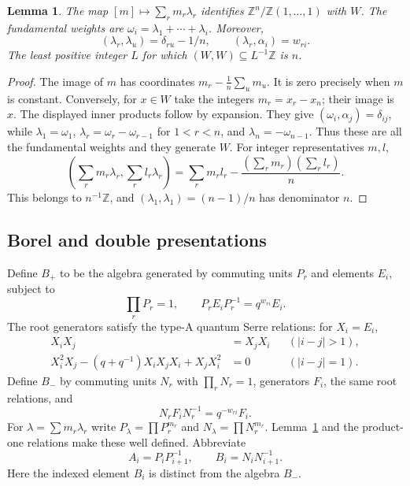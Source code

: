 \documentclass[11pt]{article}
\newtheorem{lemma}[theorem]{Lemma}
\theoremstyle{definition}
\theoremstyle{remark}
\newcommand{\Z}{\mathbb{Z}}
\begin{document}
\begin{lemma}\label{lem:lattice}
The map $[m]\mapsto\sum_r m_r\lambda_r$ identifies $\Z^n/\Z(1,\ldots,1)$ with $W$. The fundamental weights are $\omega_i=\lambda_1+\cdots+\lambda_i$. Moreover,
\[
 (\lambda_r,\lambda_u)=\delta_{ru}-1/n,\qquad
 (\lambda_r,\alpha_i)=w_{ri}.
\]
The least positive integer $L$ for which $(W,W)\subseteq L^{-1}\Z$ is $n$.
\end{lemma}
\begin{proof}
The image of $m$ has coordinates $m_r-\frac1n\sum_u m_u$. It is zero precisely when $m$ is constant. Conversely, for $x\in W$ take the integers $m_r=x_r-x_n$; their image is $x$. The displayed inner products follow by expansion. They give $(\omega_i,\alpha_j)=\delta_{ij}$, while
$\lambda_1=\omega_1$, $\lambda_r=\omega_r-\omega_{r-1}$ for $1<r<n$, and $\lambda_n=-\omega_{n-1}$. Thus these are all the fundamental weights and they generate $W$. For integer representatives $m,l$,
\[
 \left(\sum_r m_r\lambda_r,\sum_r l_r\lambda_r\right)
 =\sum_r m_rl_r-\frac{(\sum_r m_r)(\sum_r l_r)}n.
\]
This belongs to $n^{-1}\Z$, and $(\lambda_1,\lambda_1)=(n-1)/n$ has denominator $n$.
\end{proof}

\subsection{Borel and double presentations}
Define $B_+$ to be the algebra generated by commuting units $P_r$ and elements $E_i$, subject to
\begin{equation}\label{eq:positive}
 \prod_rP_r=1,\qquad P_rE_iP_r^{-1}=q^{w_{ri}}E_i.
\end{equation}
The root generators satisfy the type-A quantum Serre relations: for $X_i=E_i$,
\begin{equation}\label{eq:serre}
 \begin{aligned}
 X_iX_j&=X_jX_i &&(|i-j|>1),\\
 X_i^2X_j-(q+q^{-1})X_iX_jX_i+X_jX_i^2&=0 &&(|i-j|=1).
 \end{aligned}
\end{equation}
Define $B_-$ by commuting units $N_r$ with $\prod_rN_r=1$, generators $F_i$, the same root relations, and
\begin{equation}\label{eq:negative}
 N_rF_iN_r^{-1}=q^{-w_{ri}}F_i.
\end{equation}
For $\lambda=\sum m_r\lambda_r$ write $P_\lambda=\prod P_r^{m_r}$ and $N_\lambda=\prod N_r^{m_r}$. Lemma~\ref{lem:lattice} and the product-one relations make these well defined. Abbreviate
\[
 A_i=P_iP_{i+1}^{-1},\qquad B_i=N_iN_{i+1}^{-1}.
\]
Here the indexed element $B_i$ is distinct from the algebra $B_-$.
\end{document}
